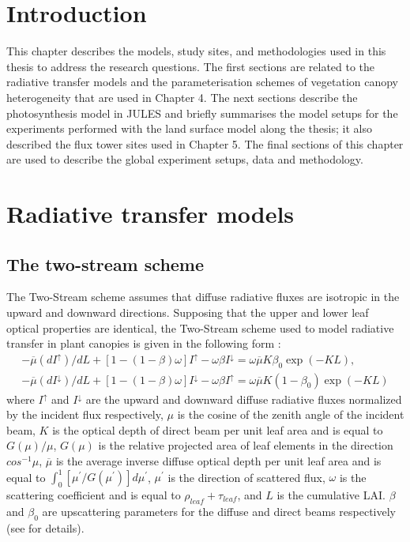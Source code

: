 \section{Introduction}\label{introduction}

This chapter describes the models, study sites, and methodologies used in this thesis to address the research questions. The first sections are related to the radiative transfer models and the parameterisation schemes of vegetation canopy heterogeneity that are used in Chapter 4. The next sections describe the photosynthesis model in JULES and briefly summarises the model setups for the experiments performed with the land surface model along the thesis; it also described the flux tower sites used in Chapter 5. The final sections of this chapter are used to describe the global experiment setups, data and methodology. 

\section{Radiative transfer models}\label{section:RTMs}

\subsection{The two-stream scheme} 
The Two-Stream scheme assumes that diffuse radiative fluxes are isotropic in the upward and downward directions. Supposing that the upper and lower leaf optical properties are identical, the Two-Stream scheme used to model radiative transfer in plant canopies is given in the following form \citep{Dickinson1983,Sellers1985}: 
\begin{equation}
\begin{gathered}
-\overline{\mu}(dI^{\uparrow})/dL + [1 - (1 - \beta)\omega]I^{\uparrow} - \omega \beta I^{\downarrow} = \omega \overline{\mu} K \beta_0 \exp{(-KL)},\\
-\overline{\mu}(dI^{\downarrow})/dL + [1 - (1 - \beta)\omega]I^{\downarrow} - \omega \beta I^{\uparrow} = \omega \overline{\mu} K (1-\beta_0) \exp{(-KL)}
\end{gathered}
\label{equation:ts}
\end{equation}
\noindent where $I^{\uparrow}$ and $I^{\downarrow}$ are the upward and downward diffuse radiative fluxes normalized by the incident flux respectively, $\mu$ is the cosine of the zenith angle of the incident beam, $K$ is the optical depth of direct beam per unit leaf area and is equal to $G(\mu)/\mu$, $G(\mu)$ is the relative projected area of leaf elements in the direction $cos^{-1}\mu$, $\overline{\mu}$ is the average inverse diffuse optical depth per unit leaf area and is equal to $\int_{0}^{1}[\mu^{\prime}/G(\mu^{\prime})]d\mu^{\prime}$, $\mu^{\prime}$ is the direction of scattered flux, $\omega$ is the scattering coefficient and is equal to $\rho_{leaf} + \tau_{leaf}$, and $L$ is the cumulative LAI. $\beta$ and $\beta_0$ are upscattering parameters for the diffuse and direct beams respectively (see \citet{Sellers1985} for details). 

